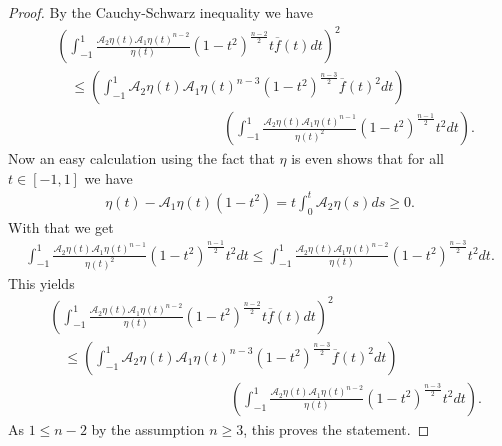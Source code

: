 \documentclass[12pt,twoside]{amsart}
\numberwithin{satz}{section}
\theoremstyle{definition}
\numberwithin{equation}{section}
\begin{document}
	\begin{proof}
		By the Cauchy-Schwarz inequality we have
		\begin{align*}
			&\left(\int_{-1}^1 \frac{\mathcal{A}_2\eta(t)\mathcal{A}_1\eta(t)^{n-2}}{\eta(t)}(1-t^2)^{\frac{n-2}{2}} t\overline{f}(t)dt\right)^2  \\
			& \quad \leq \left(\int_{-1}^1 \mathcal{A}_2\eta(t)\mathcal{A}_1\eta(t)^{n-3}(1-t^2)^{\frac{n-3}{2}} \overline{f}(t)^2dt\right)\\
			& \hspace{5cm}\left(\int_{-1}^1 \frac{\mathcal{A}_2\eta(t)\mathcal{A}_1\eta(t)^{n-1}}{\eta(t)^2}(1-t^2)^{\frac{n-1}{2}}t^2dt\right).
		\end{align*}
		Now an easy calculation using the fact that $\eta$ is even shows that for all $t\in[-1,1]$ we have
		\begin{align}\label{RK-HK_ineq}
			\eta(t)-\mathcal{A}_1\eta(t)(1-t^2)=t\int_0^t\mathcal{A}_2\eta(s)ds\geq 0.
		\end{align}
		With that we get
		\begin{align*}
			\int_{-1}^1 \frac{\mathcal{A}_2\eta(t)\mathcal{A}_1\eta(t)^{n-1}}{\eta(t)^2}(1-t^2)^{\frac{n-1}{2}}t^2dt\leq \int_{-1}^1 \frac{\mathcal{A}_2\eta(t)\mathcal{A}_1\eta(t)^{n-2}}{\eta(t)}(1-t^2)^{\frac{n-3}{2}}t^2dt.
		\end{align*}
		This yields
		\begin{align*}
			&\left(\int_{-1}^1 \frac{\mathcal{A}_2\eta(t)\mathcal{A}_1\eta(t)^{n-2}}{\eta(t)}(1-t^2)^{\frac{n-2}{2}} t\overline{f}(t)dt\right)^2  \\
			& \quad \leq  \left(\int_{-1}^1 \mathcal{A}_2\eta(t)\mathcal{A}_1\eta(t)^{n-3}(1-t^2)^{\frac{n-3}{2}} \overline{f}(t)^2dt\right)\\
			& \quad \hspace{5cm}  \left(\int_{-1}^1 \frac{\mathcal{A}_2\eta(t)\mathcal{A}_1\eta(t)^{n-2}}{\eta(t)}(1-t^2)^{\frac{n-3}{2}}t^2dt\right).
		\end{align*}
		As $1 \leq n-2$ by the assumption $n\geq 3$, this proves the statement.
	\end{proof}
	
\end{document}
